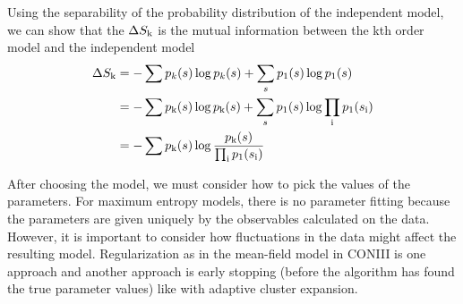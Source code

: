 \documentclass[aps,prl,twocolumn]{revtex4-1}
\begin{document}
Using the separability of the probability distribution of the independent model, we can show that the $\Delta S_{\rm k}$ is the mutual information between the kth order model and the independent model
\begin{align}
	\Delta S_{\rm k} &= -\sum p_k(s)\log p_k(s) + \sum_s p_1(s) \log p_1(s) \\
		&= -\sum p_{\rm k}(s)\log p_{\rm k}(s) + \sum_s p_1(s) \log \prod_{\rm i} p_1(s_{\rm i})\\
		&= -\sum p_{\rm k}(s)\log \frac{p_{\rm k}(s)}{\prod_{\rm i} p_1(s_{\rm i})}
\end{align}

After choosing the model, we must consider how to pick the values of the parameters. For maximum entropy models, there is no parameter fitting because the parameters are given uniquely by the observables calculated on the data. However, it is important to consider how fluctuations in the data might affect the resulting model. Regularization as in the mean-field model in CONIII is one approach and another approach is early stopping (before the algorithm has found the true parameter values) like with adaptive cluster expansion.

%
%

\end{document}
